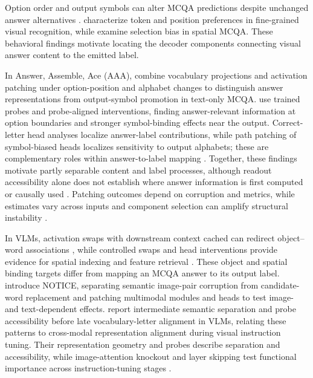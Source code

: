 \documentclass[11pt]{article}
\begin{document}
Option order and output symbols can alter MCQA predictions despite unchanged answer alternatives \citep{zheng2024large}. \citet{atabuzzaman2025benchmarking} characterize token and position preferences in fine-grained visual recognition, while \citet{zeno2025choosing} examine selection bias in spatial MCQA. These behavioral findings motivate locating the decoder components connecting visual answer content to the emitted label.

In Answer, Assemble, Ace (AAA), \citet{wiegreffe2025answerassembleaceunderstanding} combine vocabulary projections and activation patching under option-position and alphabet changes to distinguish answer representations from output-symbol promotion in text-only MCQA. \citet{wong2026decidebind} use trained probes and probe-aligned interventions, finding answer-relevant information at option boundaries and stronger symbol-binding effects near the output. Correct-letter head analyses localize answer-label contributions, while path patching of symbol-biased heads localizes sensitivity to output alphabets; these are complementary roles within answer-to-label mapping \citep{lieberum2023doescircuit,yang2025option}. Together, these findings motivate partly separable content and label processes, although readout accessibility alone does not establish where answer information is first computed or causally used \citep{wiegreffe2025answerassembleaceunderstanding,wong2026decidebind}. Patching outcomes depend on corruption and metrics, while estimates vary across inputs and component selection can amplify structural instability \citep{zhang2024patching,meloux2026statistical}.

In VLMs, activation swaps with downstream context cached can redirect object--word associations \citep{saravanan2025binding}, while controlled swaps and head interventions provide evidence for spatial indexing and feature retrieval \citep{assouel2026visualsymbolic}. These object and spatial binding targets differ from mapping an MCQA answer to its output label. \citet{golovanevsky2025notice} introduce NOTICE, separating semantic image-pair corruption from candidate-word replacement and patching multimodal modules and heads to test image- and text-dependent effects. \citet{palacios2026abstraction} report intermediate semantic separation and probe accessibility before late vocabulary-letter alignment in VLMs, relating these patterns to cross-modal representation alignment during visual instruction tuning. Their representation geometry and probes describe separation and accessibility, while image-attention knockout and layer skipping test functional importance across instruction-tuning stages \citep{palacios2026abstraction}.
\end{document}

